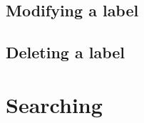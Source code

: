 \documentclass[10pt,a4paper]{article}
\begin{document}
\subsection{Modifying a label}



\subsection{Deleting a label}



\section{Searching}
\end{document}
